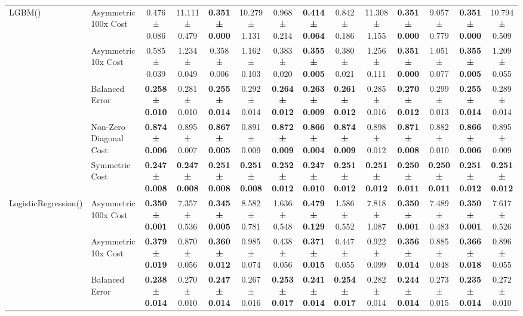 \begin{table}[H]
{\begin{tabular}{llcccccccccccc}
\cline{1-14}
\multirow[t]{5}{*}{LGBM()} & Asymmetric 100x Cost & 0.476 ± 0.086 & 11.111 ± 0.479 & \textbf{0.351 ± 0.000} & 10.279 ± 1.131 & 0.968 ± 0.214 & \textbf{0.414 ± 0.064} & 0.842 ± 0.186 & 11.308 ± 1.155 & \textbf{0.351 ± 0.000} & 9.057 ± 0.779 & \textbf{0.351 ± 0.000} & 10.794 ± 0.509 \\
 & Asymmetric 10x Cost & 0.585 ± 0.039 & 1.234 ± 0.049 & 0.358 ± 0.006 & 1.162 ± 0.103 & 0.383 ± 0.020 & \textbf{0.355 ± 0.005} & 0.380 ± 0.021 & 1.256 ± 0.111 & \textbf{0.351 ± 0.000} & 1.051 ± 0.077 & \textbf{0.355 ± 0.005} & 1.209 ± 0.055 \\
 & Balanced Error & \textbf{0.258 ± 0.010} & 0.281 ± 0.010 & \textbf{0.255 ± 0.014} & 0.292 ± 0.014 & \textbf{0.264 ± 0.012} & \textbf{0.263 ± 0.009} & \textbf{0.261 ± 0.012} & 0.285 ± 0.016 & \textbf{0.270 ± 0.012} & 0.299 ± 0.013 & \textbf{0.255 ± 0.014} & 0.289 ± 0.014 \\
 & Non-Zero Diagonal Cost & \textbf{0.874 ± 0.006} & 0.895 ± 0.007 & \textbf{0.867 ± 0.005} & 0.891 ± 0.009 & \textbf{0.872 ± 0.009} & \textbf{0.866 ± 0.004} & \textbf{0.874 ± 0.009} & 0.898 ± 0.012 & \textbf{0.871 ± 0.008} & 0.882 ± 0.010 & \textbf{0.866 ± 0.006} & 0.895 ± 0.009 \\
 & Symmetric Cost & \textbf{0.247 ± 0.008} & \textbf{0.247 ± 0.008} & \textbf{0.251 ± 0.008} & \textbf{0.251 ± 0.008} & \textbf{0.252 ± 0.012} & \textbf{0.247 ± 0.010} & \textbf{0.251 ± 0.012} & \textbf{0.251 ± 0.012} & \textbf{0.250 ± 0.011} & \textbf{0.250 ± 0.011} & \textbf{0.251 ± 0.012} & \textbf{0.251 ± 0.012} \\
\cline{1-14}
\multirow[t]{5}{*}{LogisticRegression()} & Asymmetric 100x Cost & \textbf{0.350 ± 0.001} & 7.357 ± 0.536 & \textbf{0.345 ± 0.005} & 8.582 ± 0.781 & 1.636 ± 0.548 & \textbf{0.479 ± 0.129} & 1.586 ± 0.552 & 7.818 ± 1.087 & \textbf{0.350 ± 0.001} & 7.489 ± 0.483 & \textbf{0.350 ± 0.001} & 7.617 ± 0.526 \\
 & Asymmetric 10x Cost & \textbf{0.379 ± 0.019} & 0.870 ± 0.056 & \textbf{0.360 ± 0.012} & 0.985 ± 0.074 & 0.438 ± 0.056 & \textbf{0.371 ± 0.015} & 0.447 ± 0.055 & 0.922 ± 0.099 & \textbf{0.356 ± 0.014} & 0.885 ± 0.048 & \textbf{0.366 ± 0.018} & 0.896 ± 0.055 \\
 & Balanced Error & \textbf{0.238 ± 0.014} & 0.270 ± 0.010 & \textbf{0.247 ± 0.014} & 0.267 ± 0.016 & \textbf{0.253 ± 0.017} & \textbf{0.241 ± 0.014} & \textbf{0.254 ± 0.017} & 0.282 ± 0.014 & \textbf{0.244 ± 0.014} & 0.273 ± 0.015 & \textbf{0.235 ± 0.014} & 0.272 ± 0.010 \\

\end{tabular}}
\end{table}
